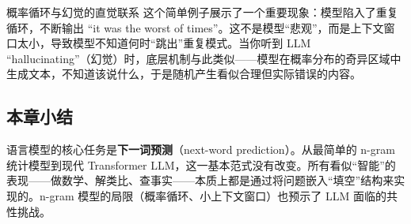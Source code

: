 \begin{warningbox}{概率循环与幻觉的直觉联系}
这个简单例子展示了一个重要现象：模型陷入了重复循环，不断输出 ``it was the worst of times''。这不是模型``悲观''，而是上下文窗口太小，导致模型不知道何时``跳出''重复模式。当你听到 LLM ``hallucinating''（幻觉）时，底层机制与此类似——模型在概率分布的奇异区域中生成文本，不知道该说什么，于是随机产生看似合理但实际错误的内容。
\end{warningbox}

\subsection{本章小结}

语言模型的核心任务是\textbf{下一词预测}（next-word prediction）。从最简单的 n-gram 统计模型到现代 Transformer LLM，这一基本范式没有改变。所有看似``智能''的表现——做数学、解类比、查事实——本质上都是通过将问题嵌入``填空''结构来实现的。n-gram 模型的局限（概率循环、小上下文窗口）也预示了 LLM 面临的共性挑战。

